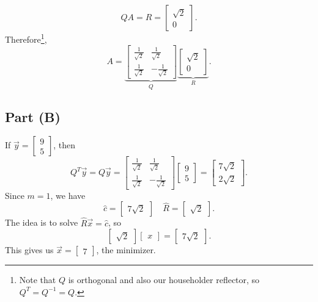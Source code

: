 \documentclass[letterpaper]{article}
\newcommand{\0}{\mathbf{0}}
\begin{document}
\[QA = R = \begin{bmatrix}
    \sqrt{2} \\ 0
\end{bmatrix}.\] Therefore\footnote{Note that $Q$ is orthogonal and also our householder reflector, so $Q^T = Q^{-1} = Q$.}, 
\[A = \underbrace{\begin{bmatrix}
    \frac{1}{\sqrt{2}} & \frac{1}{\sqrt{2}} \\ 
    \frac{1}{\sqrt{2}} & -\frac{1}{\sqrt{2}}
\end{bmatrix}}_{Q} \underbrace{\begin{bmatrix}
    \sqrt{2} \\ 0
\end{bmatrix}}_{R}.\]


\subsection*{Part (B)}
If $\vec{y} = \begin{bmatrix}
    9 \\ 5
\end{bmatrix}$, then \[Q^T \vec{y} = Q \vec{y} = \begin{bmatrix}
    \frac{1}{\sqrt{2}} & \frac{1}{\sqrt{2}} \\ 
    \frac{1}{\sqrt{2}} & -\frac{1}{\sqrt{2}}
\end{bmatrix} \begin{bmatrix}
    9 \\ 5
\end{bmatrix} = \begin{bmatrix}
    7\sqrt{2} \\ 2\sqrt{2}
\end{bmatrix}.\] Since $m = 1$, we have 
\[\hat{c} = \begin{bmatrix}
    7 \sqrt{2}
\end{bmatrix} \quad \hat{R} = \begin{bmatrix}
    \sqrt{2}
\end{bmatrix}.\] The idea is to solve $\hat{R}\vec{x} = \hat{c}$, so \[\begin{bmatrix}
    \sqrt{2}
\end{bmatrix}\begin{bmatrix}
    x
\end{bmatrix} = \begin{bmatrix}
    7\sqrt{2}
\end{bmatrix}.\]
This gives us $\vec{x} = \begin{bmatrix}
    7
\end{bmatrix}$, the minimizer.
\end{document}
